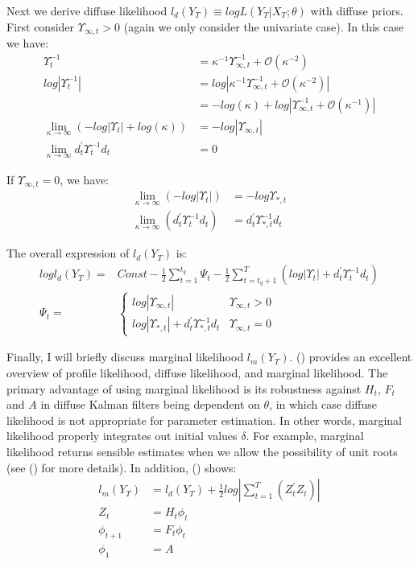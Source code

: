 \documentclass[10pt, titlepage]{article}
\numberwithin{equation}{section}
\begin{document}
Next we derive diffuse likelihood $l_d(Y_T)\equiv logL(Y_T|X_T;\theta)$ with diffuse priors. First consider $\Upsilon_{\infty,t}>0$ (again we only consider the univariate case). In this case we have:
\begin{align*}
    \Upsilon_t^{-1} &= \kappa^{-1}\Upsilon_{\infty,t}^{-1}+\mathcal{O}(\kappa^{-2}) \\
    log|\Upsilon_t^{-1}| &= log|\kappa^{-1}\Upsilon_{\infty,t}^{-1}+\mathcal{O}(\kappa^{-2})| \\
    &=-log(\kappa) + log|\Upsilon_{\infty,t}^{-1}+\mathcal{O}(\kappa^{-1})| \\
    \lim_{\kappa\rightarrow \infty}(-log|\Upsilon_t| + log(\kappa)) &= -log|\Upsilon_{\infty,t}| \\
    \lim_{\kappa\rightarrow \infty}d_t^{'}\Upsilon_t^{-1}d_t &= 0
\end{align*}

If $\Upsilon_{\infty,t}=0$, we have:
\begin{align*}
    \lim_{\kappa\rightarrow \infty}(-log|\Upsilon_t|) &= -log{\Upsilon_{*,t}} \\
    \lim_{\kappa\rightarrow \infty}(d_t^{'}\Upsilon_t^{-1}d_t) &= d_t^{'}\Upsilon_{*,t}^{-1}d_t
\end{align*}

The overall expression of $l_d(Y_T)$ is:
\begin{align*}
    logl_d(Y_T) =& Const - \frac{1}{2}\sum_{t=1}^{t_q}\Psi_t - \frac{1}{2}\sum_{t=t_q+1}^{T}(log|\Upsilon_t| + d_t^{'}\Upsilon_t^{-1}d_t) \nonumber \\
    \Psi_t =& \begin{cases}
        log|\Upsilon_{\infty,t}| & \Upsilon_{\infty,t} > 0 \\
        log|\Upsilon_{*,t}| + d_t^{'}\Upsilon_{*,t}^{-1}d_t & \Upsilon_{\infty,t}=0
    \end{cases} \nonumber
\end{align*}

Finally, I will briefly discuss marginal likelihood $l_m(Y_T)$. (\cite{francke2010likelihood}) provides an excellent overview of profile likelihood, diffuse likelihood, and marginal likelihood. The primary advantage of using marginal likelihood is its robustness against $H_t$, $F_t$ and $A$ in diffuse Kalman filters being dependent on $\theta$, in which case diffuse likelihood is not appropriate for parameter estimation. In other words, marginal likelihood properly integrates out initial values $\delta$. For example, marginal likelihood returns sensible estimates when we allow the possibility of unit roots (see (\cite{francke2007marginal}) for more details). In addition, (\cite{francke2010likelihood}) shows:
\begin{align*}
    l_m(Y_T) &= l_d(Y_T) + \frac{1}{2}log\left| \sum_{t=1}^{T}(Z_t^{'}Z_t) \right| \\
    Z_t &= H_t\phi_t \\
    \phi_{t+1} &= F_t\phi_t \\
    \phi_1 &= A
\end{align*}
\end{document}
